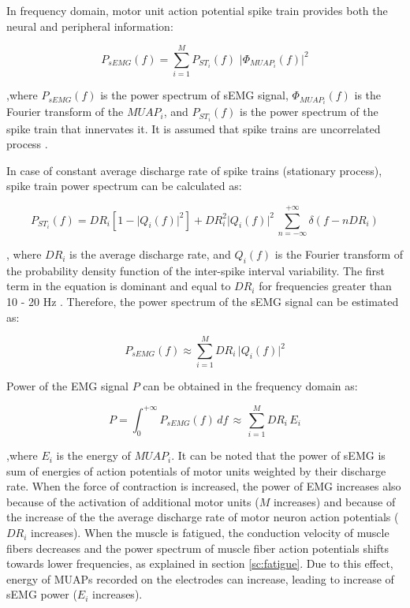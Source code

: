 In frequency domain, motor unit action potential spike train provides both the neural and peripheral information:

\begin{equation}
P_{sEMG}(f) = \sum_{i=1}^{M} P_{ST_i}(f) \, \, \big\vert \Phi_{MUAP_i}(f) \big\vert^2
\end{equation}

,where $P_{sEMG}(f)$ is the power spectrum of sEMG signal, $\Phi_{MUAP_i}(f)$ is the Fourier transform of the $MUAP_i$, and $P_{ST_i}(f)$ is the power spectrum of the spike train that innervates it. It is assumed that spike trains are uncorrelated process \citep{Farina2014}.

In case of constant average discharge rate of spike trains (stationary process), spike train power spectrum can be calculated as:

\begin{equation}
P_{ST_i}(f) = DR_i \left[ 1- \big\vert Q_i(f)\big\vert^2 \right] + DR_i^2  \big\vert Q_i(f)\big\vert^2 \,  \sum_{n=-\infty}^{+\infty} \delta(f - n DR_i)
\end{equation}

, where $DR_i$ is the average discharge rate, and $Q_i(f)$ is the Fourier transform of the probability density function of the inter-spike interval variability. The first term in the equation is dominant and equal to $DR_i$ for frequencies greater than 10 - 20 Hz \citep{Lago1977, Farina2014}. Therefore, the power spectrum of the sEMG signal can be estimated as:

\begin{equation}
P_{sEMG}(f) \approx  \sum_{i=1}^{M} DR_i \, \big\vert Q_i(f)\big\vert^2
\end{equation}

Power of the EMG signal $P$ can be obtained in the frequency domain as:

\begin{equation}
P = \int_0^{+\infty} P_{sEMG}(f) \, df  \, \approx \, \sum_{i=1}^{M} DR_i \,E_i
\end{equation}

,where $E_i$ is the energy of $MUAP_i$. It can be noted that the power of sEMG is sum of energies of action potentials of motor units weighted by their discharge rate. When the force of contraction is increased, the power of EMG increases also because of the activation of additional motor units ($M$ increases) and because of the increase of the the average discharge rate of motor neuron action potentials ($DR_i$ increases). When the muscle is fatigued, the conduction velocity of muscle fibers decreases and the power spectrum of muscle fiber action potentials shifts towards lower frequencies, as explained in section \ref{sc:fatigue}. Due to this effect, energy of MUAPs recorded on the electrodes can increase, leading to increase of sEMG power ($E_i$ increases).

